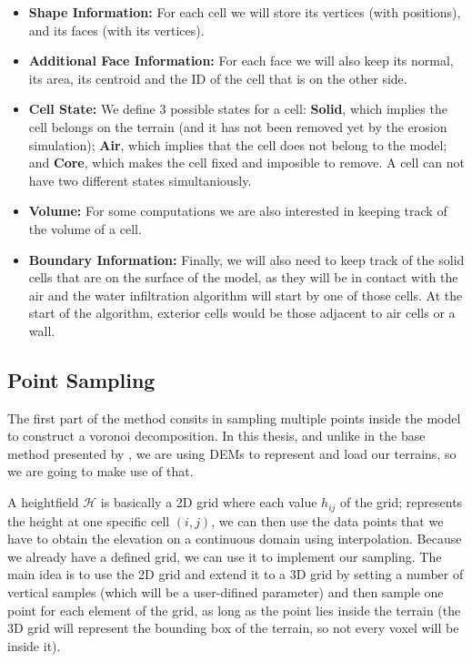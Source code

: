 \begin{itemize}
    \item \textbf{Shape Information:} For each cell we will store its 
    vertices (with positions), and its faces (with its vertices).
    \item \textbf{Additional Face Information:} For each face we will 
    also keep its normal, its area, its centroid 
    and the ID of the cell that is on the other side.
    \item \textbf{Cell State:} We define 3 possible states for a cell:
    \textbf{Solid}, which implies the cell belongs on the terrain (and 
    it has not been removed yet by the erosion simulation); \textbf{Air},
    which implies that the cell does not belong to the model; and \textbf{Core},
    which makes the cell fixed and imposible to remove. A cell can not have 
    two different states simultaniously.
    \item \textbf{Volume:} For some computations we are also interested in 
    keeping track of the volume of a cell.
    \item \textbf{Boundary Information:} Finally, we will also need to 
    keep track of the solid cells that are on the surface of the model,
    as they will be in contact with the air and the water infiltration 
    algorithm will start by one of those cells. At the start of the 
    algorithm, exterior cells would be those adjacent to air cells 
    or a wall.
\end{itemize}
 
\subsection{Point Sampling} \label{sec:pointSampling}
The first part of the method consits in sampling multiple points inside 
the model to construct a voronoi decomposition. In this thesis, and 
unlike in the base method presented by \cite{mateos_arlanzon_2023}, we 
are using DEMs to represent and load our terrains, so we are going to make 
use of that. 

\vspace{10pt}

A heightfield $\mathcal{H}$ is basically a 2D grid where each
value $h_{ij}$ of the grid; represents the height at one specific cell $(i,j)$,
we can then use the data points that we have to obtain the elevation on a continuous domain 
using interpolation. Because we already have a defined grid, we can use 
it to implement our sampling. The main idea is to use the 2D grid 
and extend it to a 3D grid by setting a number of vertical samples (which 
will be a user-difined parameter) and then sample one point for each element 
of the grid, as long as the point lies inside the terrain (the 3D grid 
will represent the bounding box of the terrain, so not every voxel will be 
inside it). 

